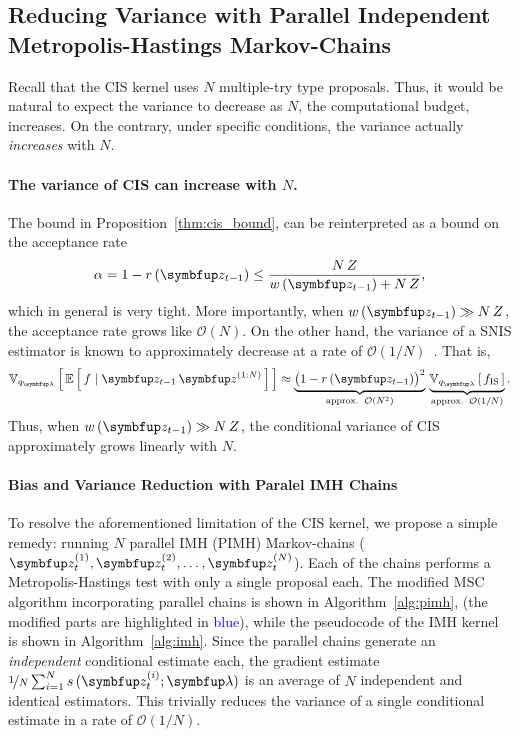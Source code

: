 \subsection{Reducing Variance with Parallel Independent Metropolis-Hastings Markov-Chains}\label{section:cis_bias}
Recall that the CIS kernel uses \(N\) multiple-try type proposals.
Thus, it would be natural to expect the variance to decrease as \(N\), the computational budget, increases.
On the contrary, under specific conditions, the variance actually \textit{increases} with \(N\).

\paragraph{The variance of CIS can increase with \(N\).}
The bound in Proposition~\ref{thm:cis_bound}, can be reinterpreted as a bound on the acceptance rate 
\begin{align}
  \alpha = 1 - r\,(\vz_{t-1}) \leq \frac{N\,Z}{ w\,(\vz_{t-1}) + N\,Z},
\end{align}
which in general is very tight.
More importantly, when \(w\,(\vz_{t-1}) \gg N\,Z\), the acceptance rate grows like \(\mathcal{O}(N)\).
On the other hand, the variance of a SNIS estimator is known to approximately decrease at a rate of \(\mathcal{O}(1/N)\)~\citep{kong_sequential_1994, robert_monte_2004, elvira_rethinking_2018}.
That is, 
\begin{align}
  \Vsub{q_{\vlambda}}{ \E{ f \mid \vz_{t-1}\,\vz^{(1:N)} } } \approx \underbrace{{\big(1 - r\,(\vz_{t-1})\big)}^2}_{\text{approx.}\;\;\mathcal{O}(N^2)} \,
  \underbrace{\Vsub{q_{\vlambda}}{ f_{\text{IS}} }}_{\text{approx.}\;\;\mathcal{O}(1/N)}.\label{eq:cis_variance_incr}
\end{align}
Thus, when \(w\,(\vz_{t-1})\gg N\,Z\), the conditional variance of CIS approximately grows linearly with \(N\).

\paragraph{Bias and Variance Reduction with Paralel IMH Chains}
To resolve the aforementioned limitation of the CIS kernel, we propose a simple remedy: running \(N\) parallel IMH (PIMH) Markov-chains (\(\vz_t^{(1)}, \vz_t^{(2)}, \ldots, \vz_t^{(N)}\)).
Each of the chains performs a Metropolis-Hastings test with only a single proposal each.
The modified MSC algorithm incorporating parallel chains is shown in Algorithm~\ref{alg:pimh}, (the modified parts are highlighted in \textcolor{blue}{blue}), while the pseudocode of the IMH kernel is shown in Algorithm~\ref{alg:imh}.
Since the parallel chains generate an \textit{independent} conditional estimate each, the gradient estimate \(\nicefrac{1}{N} \sum^{N}_{i=1} s\,(\vz_t^{(i)}; \vlambda)\) is an average of \(N\) independent and identical estimators.
This trivially reduces the variance of a single conditional estimate in a rate of \(\mathcal{O}(1/N)\).
%
%

